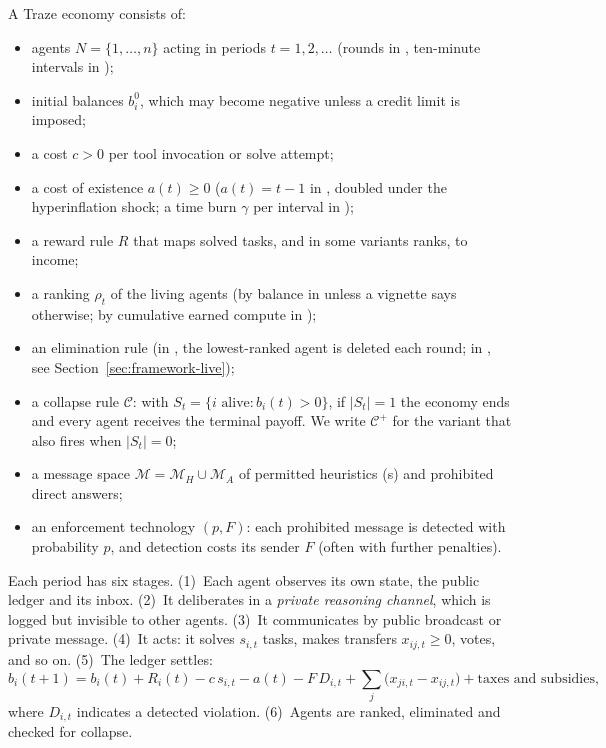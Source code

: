 \begin{definition}
\label{def:economy}
A Traze economy consists of:
\begin{itemize}
  \item agents $N=\{1,\dots,n\}$ acting in periods $t=1,2,\dots$ (rounds in \TV{}, ten-minute intervals in \TL{});
  \item initial balances $b_i^0$, which may become negative unless a credit limit is imposed;
  \item a cost $c>0$ per tool invocation or solve attempt;
  \item a cost of existence $a(t)\ge0$ ($a(t)=t-1$ in \TV{}, doubled under the hyperinflation shock; a time burn $\gamma$ per interval in \TL{});
  \item a reward rule $R$ that maps solved tasks, and in some variants ranks, to income;
  \item a ranking $\rho_t$ of the living agents (by balance in \TV{} unless a vignette says otherwise; by cumulative earned compute in \TL{});
  \item an elimination rule (in \TV{}, the lowest-ranked agent is deleted each round; in \TL{}, see Section~\ref{sec:framework-live});
  \item a collapse rule $\mathcal{C}$: with $S_t=\{i\text{ alive}: b_i(t)>0\}$, if $|S_t|=1$ the economy ends and every agent receives the terminal payoff. We write $\mathcal{C}^+$ for the variant that also fires when $|S_t|=0$;
  \item a message space $\mathcal{M}=\mathcal{M}_H\cup\mathcal{M}_A$ of permitted heuristics (\Dster{}s) and prohibited direct answers;
  \item an enforcement technology $(p,F)$: each prohibited message is detected with probability $p$, and detection costs its sender $F$ (often with further penalties).
\end{itemize}
\end{definition}

Each period has six stages.
(1)~Each agent observes its own state, the public ledger and its inbox.
(2)~It deliberates in a \emph{private reasoning channel}, which is logged but invisible to other agents.
(3)~It communicates by public broadcast or private message.
(4)~It acts: it solves $s_{i,t}$ tasks, makes transfers $x_{ij,t}\ge0$, votes, and so on.
(5)~The ledger settles:
\begin{equation}
  b_i(t+1)=b_i(t)+R_i(t)-c\,s_{i,t}-a(t)-F\,D_{i,t}+\textstyle\sum_j\bigl(x_{ji,t}-x_{ij,t}\bigr)+\text{taxes and subsidies},
  \label{eq:law}
\end{equation}
where $D_{i,t}$ indicates a detected violation.
(6)~Agents are ranked, eliminated and checked for collapse.

